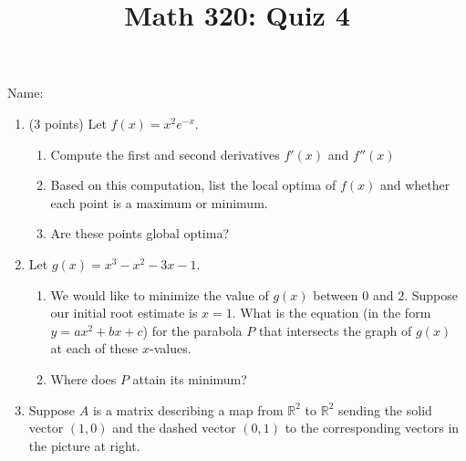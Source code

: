 \documentclass[12pt]{amsart}
\begin{document}
\flushright
Name:\underline{\hspace{5cm}}
\title{Math 320: Quiz 4}
\maketitle

\begin{enumerate}
\item (3 points) Let $f(x) = x^2e^{-x}$. 
\begin{enumerate}
\item Compute the first and second derivatives $f'(x)$ and $f''(x)$

\vspace{3cm}

\item Based on this computation, list the local optima of $f(x)$
and whether each point is a maximum or minimum. 

\vspace{4cm}

\item Are these points global optima?
\end{enumerate}

\vspace{4cm}

\item Let $g(x) = x^3 - x^2 - 3x - 1$.

\begin{enumerate}
\item We would like to minimize the value of $g(x)$
between $0$ and $2$. Suppose our initial root estimate is $x=1$.
What is the equation (in the form $y = ax^2 + bx + c$) 
for the parabola $P$ that intersects the graph of $g(x)$ at 
each of these $x$-values.

\vfill
\pagebreak

\item Where does $P$ attain its minimum?

\end{enumerate}

\vspace{4cm}

\item Suppose $A$ is a matrix describing a map from $\mathbb{R}^2$ to 
$\mathbb{R}^2$
sending the solid vector $(1,0)$ and the dashed vector $(0,1)$ to
the corresponding vectors in the picture at right. 

\vspace{5mm}


\end{enumerate}
\end{document}
